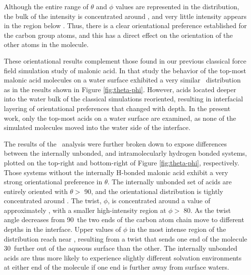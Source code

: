 Although the entire range of $\theta$ and $\phi$ values are represented in the distribution, the bulk of the intensity is concentrated around \degr, and very little intensity appears in the region below \degr. Thus, there is a clear orientational preference established for the carbon group atoms, and this has a direct effect on the orientation of the other atoms in the molecule.

These orientational results complement those found in our previous classical force field simulation study of malonic acid.\cite{Blower2012} In that study the behavior of the top-most malonic acid molecules on a water surface exhibited a very similar \thetaphi~distribution as in the results shown in Figure \ref{fig:theta-phi}. However, acids located deeper into the water bulk of the classical simulations reoriented, resulting in interfacial layering of orientational preferences that changed with depth. In the present work, only the top-most acids on a water surface are examined, as none of the simulated molecules moved into the water side of the interface.

The results of the \thetaphi~analysis were further broken down to expose differences between the internally unbonded, and intramolecularly hydrogen bonded systems, plotted on the top-right and bottom-right of Figure \ref{fig:theta-phi}, respectively. Those systems without the internally H-bonded malonic acid exhibit a very strong orientational preference in $\theta$. The internally unbonded set of acids are entirely oriented with $\theta >$ 90\degr, and the orientational distribution is tightly concentrated around \degr. The twist, $\phi$, is concentrated around a value of approximately \degr, with a smaller high-intensity region at $\phi >$ 80\degr. As the twist angle decreases from 90\degr~the two ends of the carbon atom chain move to different depths in the interface. Upper values of $\phi$ in the most intense region of the distribution reach near \degr, resulting from a twist that sends one end of the molecule 30\degr~further out of the aqueous surface than the other. The internally unbonded acids are thus more likely to experience slightly different solvation environments at either end of the molecule if one end is further away from surface waters.

